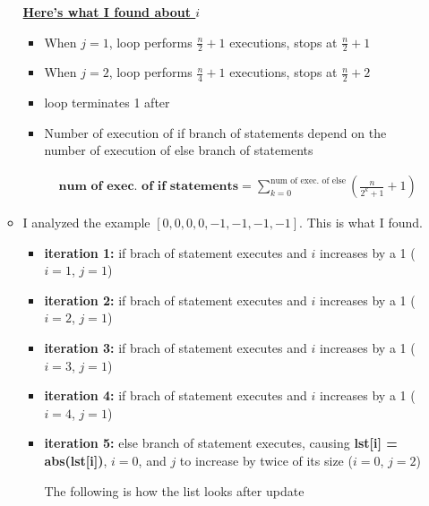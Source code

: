 \documentclass[12pt]{article}
\begin{document}
\begin{enumerate}[a.]
\begin{itemize}
        \bigskip

        \underline{\textbf{Here's what I found about $i$}}

        \bigskip

        \begin{itemize}
            \item When $j = 1$, loop performs $\frac{n}{2} + 1$ executions, stops at $\frac{n}{2} + 1$
            \item When $j = 2$, loop performs $\frac{n}{4} + 1$ executions, stops at $\frac{n}{2} + 2$
            \item loop terminates 1 after
            \item Number of execution of if branch of statements depend on the number of execution of else branch of statements

            \begin{align}
                \textbf{num of exec. of if statements} = \sum\limits_{k=0}^{\text{num of exec. of else}} \left(\frac{n}{2^k+1} + 1 \right)
            \end{align}
        \end{itemize}

        \item

        I analyzed the example $[0,0,0,0,-1,-1,-1,-1]$. This is what I found.

        \bigskip

        \begin{itemize}
            \item \textbf{iteration 1:} if brach of statement executes and $i$ increases
            by a 1 ($i = 1$, $j = 1$)
            \item \textbf{iteration 2:} if brach of statement executes and $i$ increases
            by a 1 ($i = 2$, $j = 1$)
            \item \textbf{iteration 3:} if brach of statement executes and $i$ increases
            by a 1 ($i = 3$, $j = 1$)
            \item \textbf{iteration 4:} if brach of statement executes and $i$ increases
            by a 1 ($i = 4$, $j = 1$)
            \item \textbf{iteration 5:} else branch of statement executes, causing
            \textbf{lst[i] = abs(lst[i])}, $i = 0$, and $j$ to increase by twice of its size ($i = 0$, $j = 2$)

            \bigskip

            The following is how the list looks after update


\end{itemize}
\end{itemize}
\end{enumerate}
\end{document}

